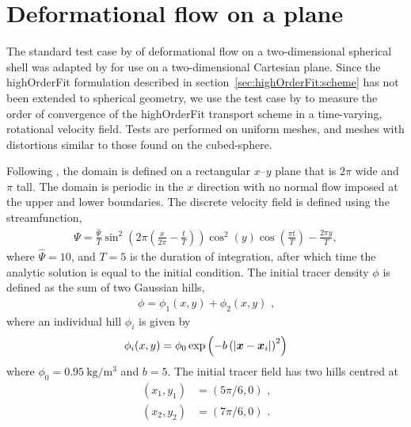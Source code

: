\section{Deformational flow on a plane}
\label{sec:highOrderFit:deformationPlane}

The standard test case by \citet{lauritzen2012} of deformational flow on a two-dimensional spherical shell was adapted by \citet{chen2017} for use on a two-dimensional Cartesian plane.
Since the highOrderFit formulation described in section~\ref{sec:highOrderFit:scheme} has not been extended to spherical geometry, we use the test case by \citet{chen2017} to measure the order of convergence of the highOrderFit transport scheme in a time-varying, rotational velocity field.
Tests are performed on uniform meshes, and meshes with distortions similar to those found on the cubed-sphere.

Following \citet{chen2017}, the domain is defined on a rectangular $x$--$y$ plane that is $2\pi$ wide and $\pi$ tall.  The domain is periodic in the $x$ direction with no normal flow imposed at the upper and lower boundaries.
The discrete velocity field is defined using the streamfunction,
\begin{align}
	\Psi = \frac{\hat{\Psi}}{T} \sin^2 \left( 2 \pi \left( \frac{x}{2\pi} - \frac{t}{T} \right) \right) \cos^2(y) \cos \left( \frac{\pi t}{T} \right) - \frac{2\pi y}{T},
\end{align}
where $\hat{\Psi} = 10$, and $T = 5$ is the duration of integration, after which time the analytic solution is equal to the initial condition.
The initial tracer density $\phi$ is defined as the sum of two Gaussian hills,
\begin{align}
	\phi = \phi_1(x,y) + \phi_2(x,y) \text{ ,}
\end{align}
where an individual hill $\phi_i$ is given by
\begin{align}
	\phi_i(x,y) = \phi_0 \exp \left( -b \left( \left\lvert \bm{x} - \bm{x}_i \right\rvert \right)^2 \right)
\end{align}
where $\phi_0 = \SI{0.95}{\kilo\gram\per\meter\cubed}$ and $b = 5$.
The initial tracer field has two hills centred at 
\begin{align}
	(x_1,y_1) &= (5 \pi /6, 0) \text{ ,} \\
	(x_2,y_2) &= (7 \pi /6, 0) \text{ .}
\end{align}

